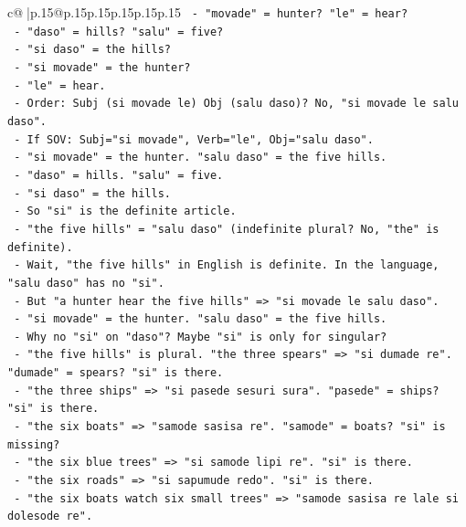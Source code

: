 \documentclass{article}
\begin{document}
{\begin{supertabular}{c@{$\;$}|p{.15\linewidth}@{}p{.15\linewidth}p{.15\linewidth}p{.15\linewidth}p{.15\linewidth}p{.15\linewidth}}
{{{\texttt{               {-} "movade" = hunter? "le" = hear?} \\
\texttt{               {-} "daso" = hills? "salu" = five?} \\
\texttt{               {-} "si daso" = the hills?} \\
\texttt{               {-} "si movade" = the hunter?} \\
\texttt{               {-} "le" = hear.} \\
\texttt{               {-} Order: Subj (si movade le) Obj (salu daso)? No, "si movade le salu daso".} \\
\texttt{               {-} If SOV: Subj="si movade", Verb="le", Obj="salu daso".} \\
\texttt{               {-} "si movade" = the hunter. "salu daso" = the five hills.} \\
\texttt{               {-} "daso" = hills. "salu" = five.} \\
\texttt{               {-} "si daso" = the hills.} \\
\texttt{               {-} So "si" is the definite article.} \\
\texttt{               {-} "the five hills" = "salu daso" (indefinite plural? No, "the" is definite).} \\
\texttt{               {-} Wait, "the five hills" in English is definite. In the language, "salu daso" has no "si".} \\
\texttt{               {-} But "a hunter hear the five hills" => "si movade le salu daso".} \\
\texttt{               {-} "si movade" = the hunter. "salu daso" = the five hills.} \\
\texttt{               {-} Why no "si" on "daso"? Maybe "si" is only for singular?} \\
\texttt{               {-} "the five hills" is plural. "the three spears" => "si dumade re". "dumade" = spears? "si" is there.} \\
\texttt{               {-} "the three ships" => "si pasede sesuri sura". "pasede" = ships? "si" is there.} \\
\texttt{               {-} "the six boats" => "samode sasisa re". "samode" = boats? "si" is missing?} \\
\texttt{               {-} "the six blue trees" => "si samode lipi re". "si" is there.} \\
\texttt{               {-} "the six roads" => "si sapumude redo". "si" is there.} \\
\texttt{               {-} "the six boats watch six small trees" => "samode sasisa re lale si dolesode re".} \\
}}}
\end{supertabular}}
\end{document}
